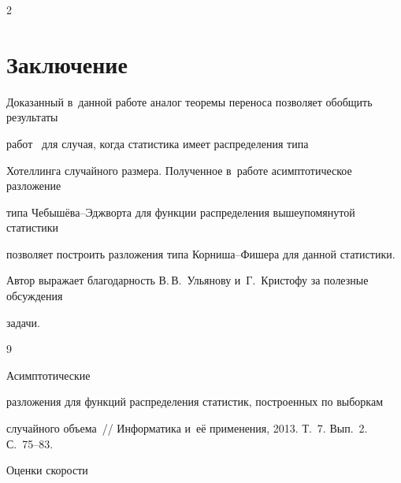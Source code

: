 \begin{multicols}{2}
\section{Заключение} %





Доказанный в~данной работе аналог теоремы переноса позволяет обобщить результаты 


работ~\cite{MMU16,CMU} для случая, когда статистика имеет распределения типа 


Хотеллинга случайного размера. Полученное в~работе асимптотическое разложение 


типа Че\-бы\-шё\-ва--Эдж\-вор\-та для функции распределения вышеупомянутой статистики 


позволяет построить разложения типа Кор\-ни\-ша--Фи\-ше\-ра для данной статистики.





\smallskip 





Автор выражает благодарность В.\,В.~Ульянову и~Г.~Кристофу за полезные обсуждения 


задачи.











{\small\frenchspacing


{%




\begin{thebibliography}{9}







 Асимптотические 


разложения для функций распределения статистик, построенных по выборкам 


случайного объема~// Информатика и~её применения, 2013. Т.~7. Вып.~2. С.~75--83.







 Оценки скорости 



\end{thebibliography}}}
\end{multicols}
